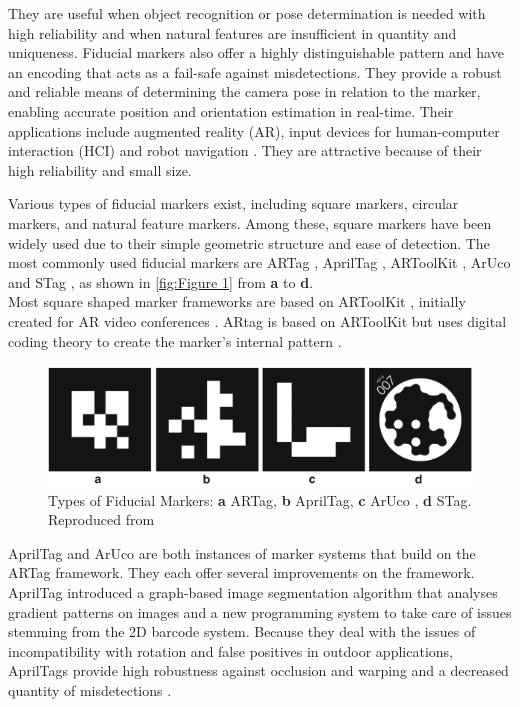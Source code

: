 \documentclass[12pt,a4paper]{report}
\def\aruco{ArUco }
\begin{document}
They are useful when object recognition or pose determination is needed with high reliability and when natural features are insufficient in quantity and uniqueness. Fiducial markers also offer a highly distinguishable pattern and have an encoding that acts as a fail-safe against misdetections. They provide a robust and reliable means of determining the camera pose in relation to the marker, enabling accurate position and orientation estimation in real-time.
Their applications include augmented reality (AR), input devices for human-computer interaction (HCI) and robot navigation \cite{reliablefiducialmarkers}. They are attractive because of their high reliability and small size.

Various types of fiducial markers exist, including square markers, circular markers, and natural feature markers. Among these, square markers have been widely used due to their simple geometric structure and ease of detection. The most commonly used fiducial markers are ARTag \cite{artag}, AprilTag \cite{apriltag}, ARToolKit \cite{artoolkit}, \aruco \cite{garrido2014automatic} and STag \cite{stag}, as shown in \autoref{fig:Figure 1} from \textbf{a} to \textbf{d}.\\
Most square shaped marker frameworks are based on ARToolKit \cite{artoolkit}, initially created for AR video conferences \cite{kato1999marker}. ARtag is based on ARToolKit but uses digital coding theory to create the marker’s internal pattern \cite{FMforposeestimation}.

\begin{figure}[h]
    \centering
    \includegraphics[width=1\textwidth]{Images/markers.png}
    \small \caption[Types of Fiducial Markers]{Types of Fiducial Markers: \textbf{a} ARTag, \textbf{b} AprilTag, \textbf{c} \aruco, \textbf{d} STag. Reproduced from \cite{FMforposeestimation}}
    \label{fig:Figure 1}
\end{figure}

AprilTag and \aruco are both instances of marker systems that build on the ARTag framework. They each offer several improvements on the framework.\\
AprilTag introduced a graph-based image segmentation algorithm that analyses gradient patterns on images and a new programming system to take care of issues stemming from the 2D barcode system. Because they deal with the issues of incompatibility with rotation and false positives in outdoor applications, AprilTags provide high robustness against occlusion and warping and a decreased quantity of misdetections \cite{FMforposeestimation}.
\end{document}
